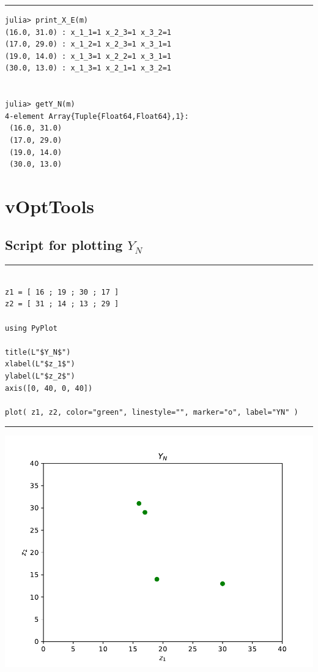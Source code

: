 \documentclass[11pt]{article}
\begin{document}
\vspace{5mm}  \vspace{2mm} \hrule

\begin{verbatim}
julia> print_X_E(m)
(16.0, 31.0) : x_1_1=1 x_2_3=1 x_3_2=1 
(17.0, 29.0) : x_1_2=1 x_2_3=1 x_3_1=1 
(19.0, 14.0) : x_1_3=1 x_2_2=1 x_3_1=1 
(30.0, 13.0) : x_1_3=1 x_2_1=1 x_3_2=1 


julia> getY_N(m)
4-element Array{Tuple{Float64,Float64},1}:
 (16.0, 31.0)
 (17.0, 29.0)
 (19.0, 14.0)
 (30.0, 13.0)
 \end{verbatim}
\break

%
%
\section{vOptTools}

\subsection{Script for plotting $Y_N$}
\vspace{5mm}  \vspace{2mm} \hrule

{%
\begin{lstlisting}

z1 = [ 16 ; 19 ; 30 ; 17 ]
z2 = [ 31 ; 14 ; 13 ; 29 ]
 
using PyPlot

title(L"$Y_N$")
xlabel(L"$z_1$")
ylabel(L"$z_2$")
axis([0, 40, 0, 40])

plot( z1, z2, color="green", linestyle="", marker="o", label="YN" )
\end{lstlisting}
}

\vspace{5mm}  \vspace{2mm} \hrule
\begin{center}
  \includegraphics[scale=0.75]{figplot.pdf}
  \end{center}
\end{document}

